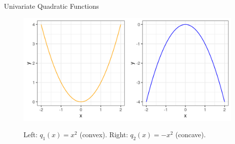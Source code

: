 \documentclass[11pt,compress,t,notes=noshow, xcolor=table]{beamer}
\begin{document}
\begin{vbframe}{Univariate Quadratic Functions}
  \begin{figure}
    \includegraphics[height=0.2\textwidth, keepaspectratio]{figure_man/quadratic_functions_1D.png} \\
    \begin{footnotesize} 
    Left: $q_1(x) = x^2$ (convex). Right: $q_2(x) = - x^2$ (concave). 
    \end{footnotesize}
  \end{figure}
  
  \end{vbframe}
  
\end{document}
